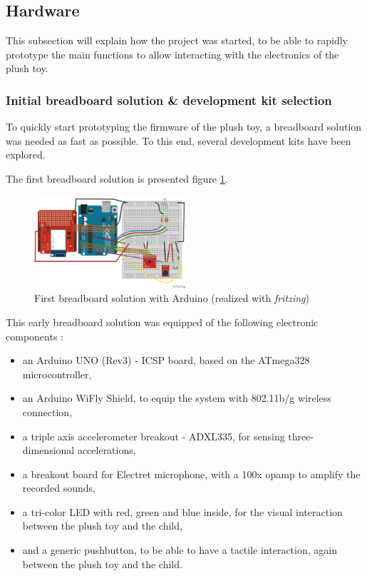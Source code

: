 
\subsection{Hardware}
\label{subsec:hardware} 

This subsection will explain how the project was started, to be able to rapidly prototype the main functions to allow interacting with the electronics of the plush toy.

\subsubsection{Initial breadboard solution \& development kit selection}
\label{subsubsec:hardware/development_kit_selection} 

To quickly start prototyping the firmware of the plush toy, a breadboard solution was needed as fast as possible. To this end, several development kits have been explored.

\medskip The first breadboard solution is presented figure \ref{fig:EE_Arduino_breadboard_solution}.

\begin{figure}[H]
    \centering
    \includegraphics[width=0.5\textwidth]{images/EE_Arduino_breadboard_solution.png}
    \caption{First breadboard solution with Arduino (realized with \textit{fritzing})}
    \label{fig:EE_Arduino_breadboard_solution}
\end{figure}

This early breadboard solution was equipped of the following electronic components : 

\begin{itemize}
    \item an Arduino UNO (Rev3) - ICSP board, based on the ATmega328 microcontroller,
    \item an Arduino WiFly Shield, to equip the system with 802.11b/g wireless connection,
    \item a triple axis accelerometer breakout - ADXL335, for sensing three-dimensional accelerations,
    \item a breakout board for Electret microphone, with a 100x opamp to amplify the recorded sounds,
    \item a tri-color LED with red, green and blue inside, for the visual interaction between the plush toy and the child,
    \item and a generic pushbutton, to be able to have a tactile interaction, again between the plush toy and the child. 
\end{itemize}

